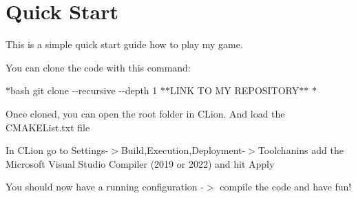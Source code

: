 \chapter{Quick Start }
\hypertarget{md_wiki_2eninge}{}\label{md_wiki_2eninge}
\label{md_wiki_2eninge_autotoc_md1}%
%


This is a simple quick start guide how to play my game.


\begin{DoxyEnumerate}
\item You can clone the code with this command\+:
\end{DoxyEnumerate}

\texorpdfstring{$\ast$}{*}{\ttfamily bash git clone -\/-\/recursive -\/-\/depth 1 \texorpdfstring{$\ast$}{*}\texorpdfstring{$\ast$}{*}\+LINK TO MY REPOSITORY\texorpdfstring{$\ast$}{*}\texorpdfstring{$\ast$}{*} \texorpdfstring{$\ast$}{*}}


\begin{DoxyEnumerate}
\item Once cloned, you can open the root folder in CLion. And load the {\ttfamily CMAKEList.\+txt} file
\item In CLion go to Settings-\/\texorpdfstring{$>$}{>}Build,Execution,Deployment-\/\texorpdfstring{$>$}{>}Toolchanins add the Microsoft Visual Studio Compiler (2019 or 2022) and hit Apply
\item You should now have a running configuration -\/\texorpdfstring{$>$}{>} compile the code and have fun! 
\end{DoxyEnumerate}